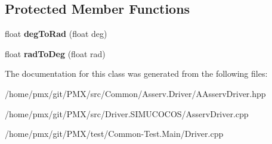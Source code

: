 \subsection*{Protected Member Functions}
\begin{DoxyCompactItemize}
\item 
\mbox{\label{classAAsservDriver_a956b5f3a782e15931aa80fd834dd63e7}} 
float {\bfseries deg\+To\+Rad} (float deg)
\item 
\mbox{\label{classAAsservDriver_a231f237f4a38854b1cc70bc87636727e}} 
float {\bfseries rad\+To\+Deg} (float rad)
\end{DoxyCompactItemize}


The documentation for this class was generated from the following files\+:\begin{DoxyCompactItemize}
\item 
/home/pmx/git/\+P\+M\+X/src/\+Common/\+Asserv.\+Driver/A\+Asserv\+Driver.\+hpp\item 
/home/pmx/git/\+P\+M\+X/src/\+Driver.\+S\+I\+M\+U\+C\+O\+C\+O\+S/Asserv\+Driver.\+cpp\item 
/home/pmx/git/\+P\+M\+X/test/\+Common-\/\+Test.\+Main/Driver.\+cpp\end{DoxyCompactItemize}
